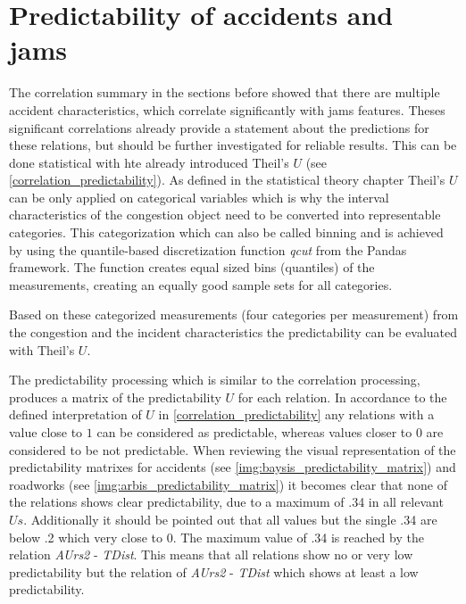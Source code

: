 \section{Predictability of accidents and jams}
\label{analysis_summary_predictability}
The correlation summary in the sections before showed that there are multiple accident characteristics, which correlate significantly with jams features. Theses significant correlations already provide a statement about the predictions for these relations, but should be further investigated for reliable results. This can be done statistical with hte already introduced Theil's $U$ (see \cref{correlation_predictability}). As defined in the statistical theory chapter Theil's $U$ can be only applied on categorical variables which is why the interval characteristics of the congestion object need to be converted into representable categories. This categorization which can also be called binning and is achieved by using the quantile-based discretization function \textit{qcut} from the Pandas framework. The function creates equal sized bins (quantiles) of the measurements, creating an equally good sample sets for all categories. 

Based on these categorized measurements (four categories per measurement) from the congestion and the incident characteristics the predictability can be evaluated with Theil's $U$.

The predictability processing which is similar to the correlation processing, produces a matrix of the predictability $U$ for each relation. In accordance to the defined interpretation of $U$ in \cref{correlation_predictability} any relations with a value close to $1$ can be considered as predictable, whereas values closer to $0$ are considered to be not predictable. When reviewing the visual representation of the predictability matrixes for accidents (see \cref{img:baysis_predictability_matrix}) and roadworks (see \cref{img:arbis_predictability_matrix}) it becomes clear that none of the relations shows clear predictability, due to a maximum of .34 in all relevant $Us$. Additionally it should be pointed out that all values but the single .34 are below .2 which very close to $0$. The maximum value of .34 is reached by the relation \textit{AUrs2} - \textit{TDist}. This means that all relations show no or very low predictability but the relation of \textit{AUrs2} - \textit{TDist} which shows at least a low predictability.
